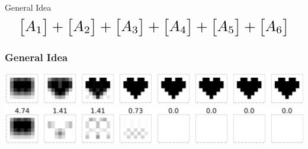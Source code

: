 \documentclass[aspectratio=169]{beamer}
\begin{document}
\begin{frame}{General Idea}
\[\scalebox{1.8}{$\begin{bmatrix} A_1 \end{bmatrix} +  \begin{bmatrix} A_2 \end{bmatrix} +  \begin{bmatrix} A_3 \end{bmatrix} +  \begin{bmatrix} A_4 \end{bmatrix} +  \begin{bmatrix} A_5 \end{bmatrix} +  \begin{bmatrix} A_6 \end{bmatrix} $}\]
\end{frame}
\begin{frame}
\frametitle{General Idea}
  \begin{center}
  \includegraphics[scale = 0.1]{images/heart.png}
  \includegraphics[scale = 0.1]{images/svdheart.png}
  \end{center}
\end{frame}
\end{document}
